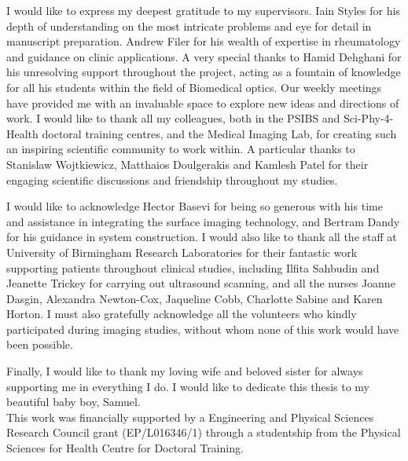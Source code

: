 \documentclass[twoside]{bhamthesis}
\theoremstyle{definition}
\begin{document}
\begin{acknowledgements}

I would like to express my deepest gratitude to my supervisors. Iain Styles for his depth of understanding on the most intricate problems and eye for detail in manuscript preparation. Andrew Filer for his wealth of expertise in rheumatology and guidance on clinic applications. A very special thanks to Hamid Dehghani for his unresolving support throughout the project, acting as a fountain of knowledge for all his students within the field of Biomedical optics. Our weekly meetings have provided me with an invaluable space to explore new ideas and directions of work. I would like to thank all my colleagues, both in the PSIBS and Sci-Phy-4-Health doctoral training centres, and the Medical Imaging Lab, for creating such an inspiring scientific community to work within. A particular thanks to Stanislaw Wojtkiewicz, Matthaios Doulgerakis and Kamlesh Patel for their engaging scientific discussions and friendship throughout my studies. 

I would like to acknowledge Hector Basevi for being so generous with his time and assistance in integrating the surface imaging technology, and Bertram Dandy for his guidance in system construction. I would also like to thank all the staff at University of Birmingham Research Laboratories for their fantastic work supporting patients throughout clinical studies, including Ilfita Sahbudin and Jeanette Trickey for carrying out ultrasound scanning, and all the nurses Joanne Dasgin, Alexandra Newton-Cox, Jaqueline Cobb, Charlotte Sabine and Karen Horton. I must also gratefully acknowledge all the volunteers who kindly participated during imaging studies, without whom none of this work would have been possible. 

Finally, I would like to thank my loving wife and beloved sister for always supporting me in everything I do. I would like to dedicate this thesis to my beautiful baby boy, Samuel.
\\[2cm]
This work was financially supported by a Engineering and Physical Sciences Research Council grant (EP/L016346/1) through a studentship from the Physical Sciences for Health Centre for Doctoral Training.
\end{acknowledgements}
\end{document}
